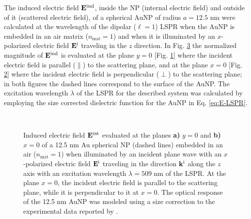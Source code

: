 The induced electric field $\vb{E}^\text{ind}$, inside the NP (internal electric field) and outside of it (scattered electric field), of a spherical AuNP of radius $a = 12.5$ nm were calculated at the wavelength of the dipolar ($\ell = 1$) LSPR when the AuNP is embedded in an air matrix ($n_\text{mat} = 1$) and when it is illuminated by an $x$-polarized electric field $\vb{E}^\text{i}$ traveling in the $z$ direction. In Fig. \ref{fig:NearField} the normalized magnitude of $\vb{E}^\text{ind}$ is evaluated at the plane $y = 0$ [Fig. \ref{fig:NearField:par}] where the incident electric field is parallel ($\parallel$) to the scattering plane, and at the plane $x = 0$ [Fig. \ref{fig:NearField:perp}]  where the incident electric field is perpendicular ($\perp$) to the scattering plane; in both figures the dashed lines correspond to the surface of the AuNP. The excitation wavelength $\lambda$ of the LSPR for the described system was calculated by employing the size corrected dielectric function for the AuNP in Eq. \eqref{eq:E-LSPR}.

\begin{figure}[t!]
	\def\svgwidth{\textwidth} \small\centering
		\vspace*{4.em}
		\hspace*{-.45\textwidth}
	\begin{subfigure}{.49\textwidth}%
		\caption{ } \label{fig:NearField:par}%
		\end{subfigure}%
	\begin{subfigure}{.49\textwidth}%
		\caption{ }\label{fig:NearField:perp}%
		\end{subfigure}%
	\vspace*{-7.em}\\
	\vspace*{-2em}
	\caption[Induced Electric Field of a 12.5 nm Au Spherical NP Embedded into Air at the LSPR]{Induced electric field $\vb{E}^\text{int}$ evaluated at the planes \textbf{a)} $y = 0$ and \textbf{b)} $x = 0$  of a 12.5 nm Au spherical NP (dashed lines) embedded in an air ($n_\text{mat} = 1$) when illuminated by an incident plane wave with an $x$-polarized electric field $\vb{E}^\text{i}$ traveling in the direction $\vb{k}^\text{i}$ along the $z$ axis with an	 excitation wavelength $\lambda = 509$ nm of the LSPR. At the plane $x = 0$, the incident electric field is parallel to the scattering plane, while it is perpendicular to it at $x = 0$. The optical response of the 12.5 nm AuNP was modeled using a size correction to the experimental data reported by \citeauthor{johnson_optical_1972} \cite{johnson_optical_1972}.}
	\label{fig:NearField}
 \end{figure}

